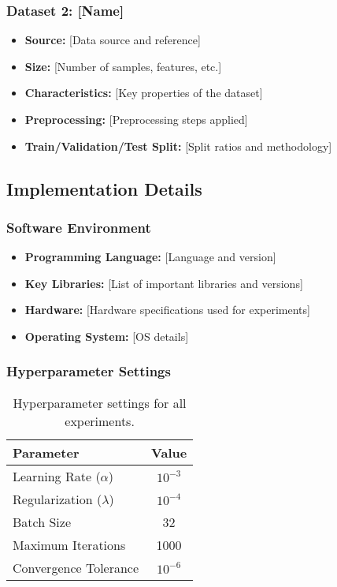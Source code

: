 \subsubsection{Dataset 2: [Name]}
\begin{itemize}
    \item \textbf{Source:} [Data source and reference]
    \item \textbf{Size:} [Number of samples, features, etc.]
    \item \textbf{Characteristics:} [Key properties of the dataset]
    \item \textbf{Preprocessing:} [Preprocessing steps applied]
    \item \textbf{Train/Validation/Test Split:} [Split ratios and methodology]
\end{itemize}

\subsection{Implementation Details}
\label{app:implementation}

\subsubsection{Software Environment}
\begin{itemize}
    \item \textbf{Programming Language:} [Language and version]
    \item \textbf{Key Libraries:} [List of important libraries and versions]
    \item \textbf{Hardware:} [Hardware specifications used for experiments]
    \item \textbf{Operating System:} [OS details]
\end{itemize}

\subsubsection{Hyperparameter Settings}
\begin{table}[htbp]
\centering
\caption{Hyperparameter settings for all experiments.}
\label{tab:hyperparameters}
\begin{tabular}{lc}
\toprule
Parameter & Value \\
\midrule
Learning Rate ($\alpha$) & $10^{-3}$ \\
Regularization ($\lambda$) & $10^{-4}$ \\
Batch Size & 32 \\
Maximum Iterations & 1000 \\
Convergence Tolerance & $10^{-6}$ \\
\bottomrule
\end{tabular}
\end{table}

